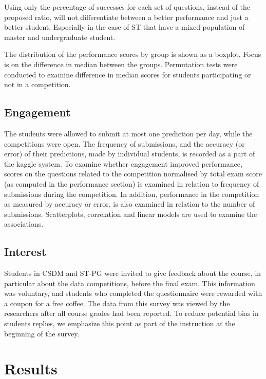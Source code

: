 \documentclass[12pt]{article}
\begin{document}
Using only the percentage of successes for each set of questions,
instead of the proposed ratio, will not differentiate between a better
performance and just a better student. Especially in the case of ST that
have a mixed population of master and undergraduate student.

The distribution of the performance scores by group is shown as a
boxplot. Focus is on the difference in median between the groups.
Permutation tests were conducted to examine difference in median scores
for students participating or not in a competition.

\subsection{Engagement}\label{engagement}

The students were allowed to submit at most one prediction per day,
while the competitions were open. The frequency of submissions, and the
accuracy (or error) of their predictions, made by individual students,
is recorded as a part of the kaggle system. To examine whether
engagement improved performance, scores on the questions related to the
competition normalised by total exam score (as computed in the
performance section) is examined in relation to frequency of submissions
during the competition. In addition, performance in the competition as
measured by accuracy or error, is also examined in relation to the
number of submissions. Scatterplots, correlation and linear models are
used to examine the associations.

\subsection{Interest}\label{interest}

Students in CSDM and ST-PG were invited to give feedback about the
course, in particular about the data competitions, before the final
exam. This information was voluntary, and students who completed the
questionnaire were rewarded with a coupon for a free coffee. The data
from this survey was viewed by the researchers after all course grades
had been reported. To reduce potential bias in students replies, we
emphasize this point as part of the instruction at the beginning of the
survey.

\section{Results}\label{results}
\end{document}
